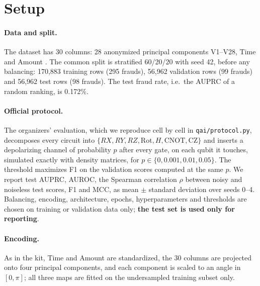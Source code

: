 \documentclass[10pt,twocolumn]{article}
\theoremstyle{definition}
\begin{document}
\section{Setup}

\paragraph{Data and split.} The dataset has 30 columns: 28 anonymized principal components V1--V28, Time and
Amount \citep{dalpozzolo2015}. The common split is stratified 60/20/20 with seed 42, before any balancing: 170,883
training rows (295 frauds), 56,962 validation rows (99 frauds) and 56,962 test rows (98 frauds). The test fraud
rate, i.e.\ the AUPRC of a random ranking, is 0.172\%.

\paragraph{Official protocol.} The organizers' evaluation, which we reproduce cell by cell in
\texttt{qai/protocol.py}, decomposes every circuit into $\{RX, RY, RZ, \mathrm{Rot}, H, \mathrm{CNOT},
\mathrm{CZ}\}$ and inserts a depolarizing channel of probability $p$ after every gate, on each qubit it touches,
simulated exactly with density matrices, for $p\in\{0, 0.001, 0.01, 0.05\}$. The threshold maximizes F1 on the
validation scores computed at the same $p$. We report test AUPRC, AUROC, the Spearman correlation $\rho$ between
noisy and noiseless test scores, F1 and MCC, as mean $\pm$ standard deviation over seeds 0--4. Balancing, encoding,
architecture, epochs, hyperparameters and thresholds are chosen on training or validation data only; \textbf{the
test set is used only for reporting}.

\paragraph{Encoding.} As in the kit, Time and Amount are standardized, the 30 columns are projected onto four
principal components, and each component is scaled to an angle in $[0,\pi]$; all three maps are fitted on the
undersampled training subset only.
\end{document}
